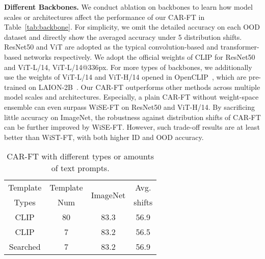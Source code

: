 \documentclass[pdflatex,sn-basic,iicol]{sn-jnl}
\theoremstyle{thmstyleone}\newtheorem{theorem}{Theorem}\newtheorem{proposition}[theorem]{Proposition}
\theoremstyle{thmstyletwo}\newtheorem{example}{Example}\newtheorem{remark}{Remark}
\theoremstyle{thmstylethree}\newtheorem{definition}{Definition}
\begin{document}
\noindent\textbf{Different Backbones.} We conduct ablation on backbones to learn how model scales or architectures affect the performance of our CAR-FT in Table~\ref{tab:backbone}. For simplicity, we omit the detailed accuracy on each OOD dataset and directly show the averaged accuracy under 5 distribution shifts. ResNet50 and ViT are adopted as the typical convolution-based and transformer-based networks respectively. We adopt the official weights of CLIP for ResNet50 and ViT-L/14, ViT-L/14@336px. For more types of backbones, we additionally use the weights of ViT-L/14 and ViT-H/14 opened in OpenCLIP~\citep{ilharco_gabriel_2021_5143773}, which are pre-trained on LAION-2B~\citep{schuhmannlaion}. Our CAR-FT outperforms other methods across multiple model scales and architectures. Especially, a plain CAR-FT without weight-space ensemble can even surpass WiSE-FT on ResNet50 and ViT-H/14. By sacrificing little accuracy on ImageNet, the robustness against distribution shifts of CAR-FT can be further improved by WiSE-FT. However, such trade-off results are at least better than WiST-FT, with both higher ID and OOD accuracy.  

\begin{table}[t]
\begin{center}
\caption{CAR-FT with different types or amounts of text prompts. } \label{tab:template}
\begin{tabular}{c|c|c|c}
\toprule
Template & Template & \multirow{2}{*}{ImageNet} & Avg. \\
Types & Num &  & shifts \\
\midrule
CLIP & 80 & 83.3 & 56.9 \\
CLIP & 7 & 83.2 & 56.5 \\
Searched & 7 & 83.2 & 56.9 \\
\bottomrule
\end{tabular}
\end{center}
\end{table}
\end{document}
